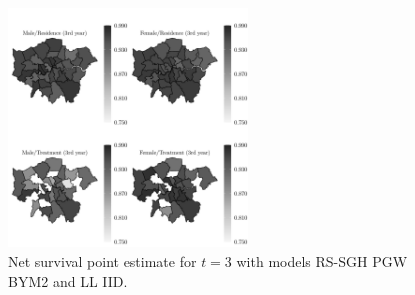 \documentclass[10pt, aspectratio = 169, handout]{beamer} %
\begin{document}
    \begin{frame}[t]
		\frametitle{}
		\justifying

        \vspace{-12pt}
        \begin{figure}[!ht]
        	\centering
        	\includegraphics[width = 0.565\textwidth]{Images/cs02-t3-mean.jpg}
            \caption{Net survival point estimate for $t = 3$ with models RS-SGH PGW BYM2 and \hspace{1pt}LL IID.}
        	\label{fig:cs02-t3-mean}
        \end{figure}

	\end{frame}
\end{document}
